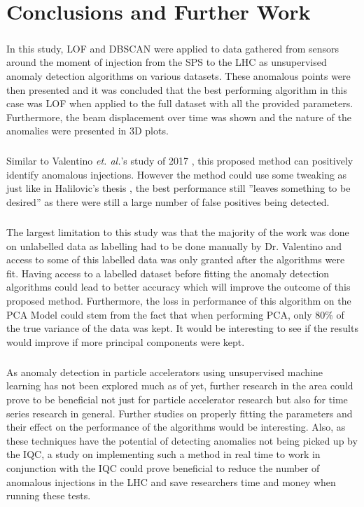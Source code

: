 \chapter{Conclusions and Further Work}
\label{chp6}
\paragraph{ }In this study, \acs{LOF} and \acs{DBSCAN} were applied to data gathered from sensors around the moment of injection from the \acs{SPS} to the \acs{LHC} as unsupervised anomaly detection algorithms on various datasets. These anomalous points were then presented and it was concluded that the best performing algorithm in this case was \acs{LOF} when applied to the full dataset with all the provided parameters. Furthermore, the beam displacement over time was shown and the nature of the anomalies were presented in 3D plots.

\paragraph{ }Similar to Valentino \textit{et. al.}'s study of 2017 \cite{Valentino2017}, this proposed method can positively identify anomalous injections. However the method could use some tweaking as just like in Halilovic's thesis \cite{Halilovic2018}, the best performance still ''leaves something to be desired'' as there were still a large number of false positives being detected.

\paragraph{ }The largest limitation to this study was that the majority of the work was done on unlabelled data as labelling had to be done manually by Dr. Valentino and access to some of this labelled data was only granted after the algorithms were fit. Having access to a labelled dataset before fitting the anomaly detection algorithms could lead to better accuracy which will improve the outcome of this proposed method. Furthermore, the loss in performance of this algorithm on the \acs{PCA} Model could stem from the fact that when performing \acs{PCA}, only 80\% of the true variance of the data was kept. It would be interesting to see if the results would improve if more principal components were kept.

\paragraph{ }As anomaly detection in particle accelerators using unsupervised machine learning has not been explored much as of yet, further research in the area could prove to be beneficial not just for particle accelerator research but also for time series research in general. Further studies on properly fitting the parameters and their effect on the performance of the algorithms would be interesting. Also, as these techniques have the potential of detecting anomalies not being picked up by the \acs{IQC}, a study on implementing such a method in real time to work in conjunction with the \acs{IQC} could prove beneficial to reduce the number of anomalous injections in the \acs{LHC} and save researchers time and money when running these tests.